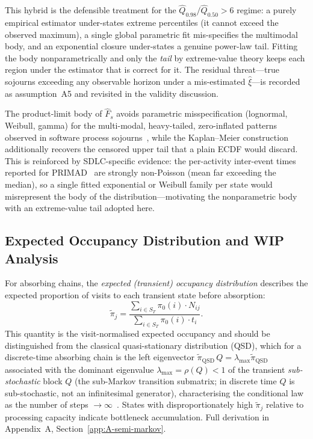 \begin{remark}
\label{rem:tail-rationale}
This hybrid is the defensible treatment for the $\hat{Q}_{0.98}/\hat{Q}_{0.50}
> 6$ regime: a purely empirical estimator under-states extreme percentiles
(it cannot exceed the observed maximum), a single global parametric fit
mis-specifies the multimodal body, and an exponential closure under-states a
genuine power-law tail. Fitting the body nonparametrically and only the
\emph{tail} by extreme-value theory keeps each region under the estimator
that is correct for it. The residual threat---true sojourns exceeding any
observable horizon under a mis-estimated $\hat{\xi}$---is recorded as
assumption~A5 and revisited in the validity discussion.
\end{remark}

\begin{remark}
\label{rem:nonparametric}
The product-limit body of $\hat{F}_s$ avoids parametric misspecification
(lognormal, Weibull, gamma) for the multi-modal, heavy-tailed, zero-inflated
patterns observed in software process sojourns~\cite{vacanti2015}, while the
Kaplan--Meier construction additionally recovers the censored upper tail that
a plain ECDF would discard. This is reinforced by SDLC-specific evidence:
the per-activity inter-event times reported for PRIMAD~\cite{guinea2025} are
strongly non-Poisson (mean far exceeding the median), so a single fitted
exponential or Weibull family per state would misrepresent the body of the
distribution---motivating the nonparametric body with an extreme-value tail
adopted here.
\end{remark}


\subsection{Expected Occupancy Distribution and WIP Analysis}
\label{sec:s3-stationary}

For absorbing chains, the \emph{expected (transient) occupancy
distribution} describes the expected proportion of visits to each transient
state before absorption:
\begin{equation}
\label{eq:quasi-stationary}
\tilde{\pi}_j = \frac{\sum_{i \in S_T} \pi_0(i) \cdot N_{ij}}
    {\sum_{i \in S_T} \pi_0(i) \cdot t_i}.
\end{equation}
This quantity is the visit-normalised expected occupancy and should be
distinguished from the classical quasi-stationary distribution (QSD), which
for a discrete-time absorbing chain is the left eigenvector
$\tilde{\pi}_{\text{QSD}}\,Q = \lambda_{\max}\tilde{\pi}_{\text{QSD}}$
associated with the dominant eigenvalue $\lambda_{\max} = \rho(Q) < 1$ of the
transient \emph{sub-stochastic} block $Q$ (the sub-Markov transition
submatrix; in discrete time $Q$ is sub-stochastic, not an infinitesimal
generator), characterising the conditional law as the number of steps
$\to \infty$~\cite{darroch1965quasi}.
States with disproportionately high $\tilde{\pi}_j$ relative to processing
capacity indicate bottleneck accumulation. Full derivation in
Appendix~A, Section~\ref{app:A-semi-markov}.


